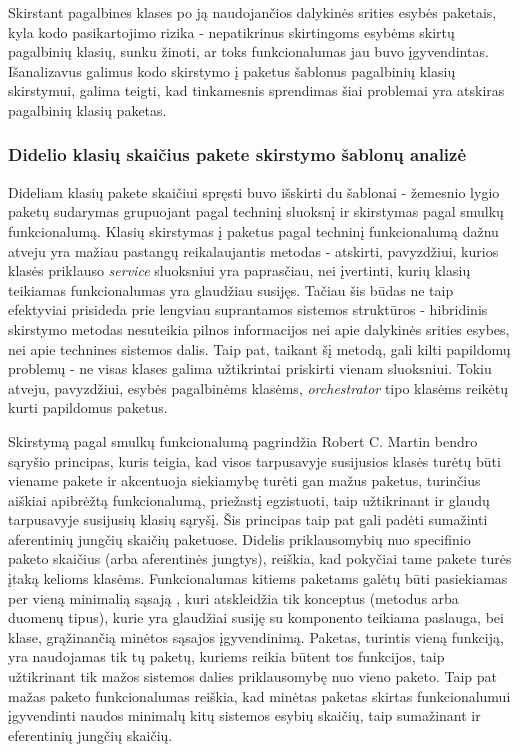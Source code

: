 Skirstant pagalbines klases po ją naudojančios dalykinės srities esybės paketais, kyla kodo pasikartojimo rizika - nepatikrinus skirtingoms esybėms skirtų pagalbinių
klasių, sunku žinoti, ar toks funkcionalumas jau buvo įgyvendintas.
Išanalizavus galimus kodo skirstymo į paketus šablonus pagalbinių klasių skirstymui, galima teigti, kad tinkamesnis sprendimas šiai
problemai yra atskiras pagalbinių klasių paketas.

\subsubsection{Didelio klasių skaičius pakete skirstymo šablonų analizė}
Dideliam klasių pakete skaičiui spręsti buvo išskirti du šablonai - žemesnio lygio paketų sudarymas grupuojant pagal techninį sluoksnį ir
skirstymas pagal smulkų funkcionalumą.
Klasių skirstymas į paketus pagal techninį funkcionalumą dažnu atveju yra mažiau pastangų reikalaujantis metodas - atskirti,
pavyzdžiui, kurios klasės priklauso \textit{service} sluoksniui yra paprasčiau, nei įvertinti, kurių klasių teikiamas funkcionalumas yra glaudžiau susijęs.
Tačiau šis būdas ne taip efektyviai prisideda prie lengviau suprantamos sistemos struktūros -
hibridinis skirstymo metodas nesuteikia pilnos informacijos nei apie dalykinės srities esybes, nei apie technines sistemos dalis.
Taip pat, taikant šį metodą, gali kilti papildomų problemų - ne visas klases galima užtikrintai priskirti vienam sluoksniui.
Tokiu atveju, pavyzdžiui, esybės pagalbinėms klasėms, \textit{orchestrator} tipo klasėms reikėtų kurti papildomus paketus.

Skirstymą pagal smulkų funkcionalumą pagrindžia Robert C. Martin bendro sąryšio principas, kuris teigia, kad visos tarpusavyje susijusios klasės turėtų būti viename pakete ir
akcentuoja siekiamybę turėti gan mažus paketus, turinčius aiškiai apibrėžtą funkcionalumą, priežastį egzistuoti, taip užtikrinant ir
glaudų tarpusavyje susijusių klasių sąryšį.
Šis principas taip pat gali padėti sumažinti aferentinių jungčių skaičių paketuose.
Didelis priklausomybių nuo specifinio paketo skaičius (arba aferentinės jungtys), reiškia, kad pokyčiai tame pakete turės įtaką kelioms klasėms.
Funkcionalumas kitiems paketams galėtų būti pasiekiamas per vieną minimalią sąsają ,
kuri atskleidžia tik konceptus (metodus arba duomenų tipus), kurie yra glaudžiai susiję su komponento teikiama paslauga, bei
klase, grąžinančią minėtos sąsajos įgyvendinimą.
Paketas, turintis vieną funkciją, yra naudojamas tik tų paketų, kuriems reikia būtent tos funkcijos,
taip užtikrinant tik mažos sistemos dalies priklausomybę nuo vieno paketo.
Taip pat mažas paketo funkcionalumas reiškia, kad minėtas paketas skirtas funkcionalumui įgyvendinti naudos minimalų kitų sistemos esybių skaičių,
taip sumažinant ir eferentinių jungčių skaičių.

